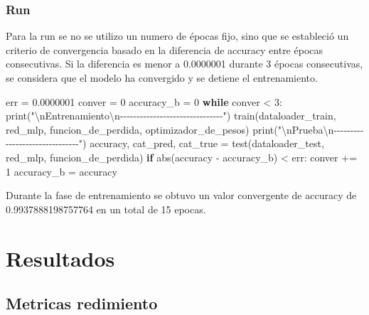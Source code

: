 \documentclass[
  10pt,
]{article}
\newenvironment{Shaded}{\begin{snugshade}}{\end{snugshade}}
\newcommand{\BuiltInTok}[1]{\textcolor[rgb]{0.00,0.23,0.31}{#1}}
\newcommand{\CharTok}[1]{\textcolor[rgb]{0.13,0.47,0.30}{#1}}
\newcommand{\ControlFlowTok}[1]{\textcolor[rgb]{0.00,0.23,0.31}{\textbf{#1}}}
\newcommand{\DecValTok}[1]{\textcolor[rgb]{0.68,0.00,0.00}{#1}}
\newcommand{\FloatTok}[1]{\textcolor[rgb]{0.68,0.00,0.00}{#1}}
\newcommand{\NormalTok}[1]{\textcolor[rgb]{0.00,0.23,0.31}{#1}}
\newcommand{\OperatorTok}[1]{\textcolor[rgb]{0.37,0.37,0.37}{#1}}
\newcommand{\StringTok}[1]{\textcolor[rgb]{0.13,0.47,0.30}{#1}}
\begin{document}
\subsubsection{Run}\label{run}

Para la run se no se utilizo un numero de épocas fijo, sino que se
estableció un criterio de convergencia basado en la diferencia de
accuracy entre épocas consecutivas. Si la diferencia es menor a
0.0000001 durante 3 épocas consecutivas, se considera que el modelo ha
convergido y se detiene el entrenamiento.

\begin{Shaded}
\begin{Highlighting}[]
\NormalTok{err }\OperatorTok{=} \FloatTok{0.0000001}
\NormalTok{conver }\OperatorTok{=} \DecValTok{0}
\NormalTok{accuracy\_b }\OperatorTok{=} \DecValTok{0}
\ControlFlowTok{while}\NormalTok{ conver }\OperatorTok{\textless{}} \DecValTok{3}\NormalTok{:}
    \BuiltInTok{print}\NormalTok{(}\StringTok{"}\CharTok{\textbackslash{}n}\StringTok{Entrenamiento}\CharTok{\textbackslash{}n}\StringTok{{-}{-}{-}{-}{-}{-}{-}{-}{-}{-}{-}{-}{-}{-}{-}{-}{-}{-}{-}{-}{-}{-}{-}{-}{-}{-}{-}{-}{-}{-}{-}"}\NormalTok{)}
\NormalTok{    train(dataloader\_train, red\_mlp, funcion\_de\_perdida, optimizador\_de\_pesos)}
    \BuiltInTok{print}\NormalTok{(}\StringTok{"}\CharTok{\textbackslash{}n}\StringTok{Prueba}\CharTok{\textbackslash{}n}\StringTok{{-}{-}{-}{-}{-}{-}{-}{-}{-}{-}{-}{-}{-}{-}{-}{-}{-}{-}{-}{-}{-}{-}{-}{-}{-}{-}{-}{-}{-}{-}{-}"}\NormalTok{)}
\NormalTok{    accuracy, cat\_pred, cat\_true }\OperatorTok{=}\NormalTok{ test(dataloader\_test, red\_mlp, funcion\_de\_perdida)}
    \ControlFlowTok{if} \BuiltInTok{abs}\NormalTok{(accuracy }\OperatorTok{{-}}\NormalTok{ accuracy\_b) }\OperatorTok{\textless{}}\NormalTok{ err:}
\NormalTok{        conver }\OperatorTok{+=} \DecValTok{1}
\NormalTok{    accuracy\_b }\OperatorTok{=}\NormalTok{ accuracy}
\end{Highlighting}
\end{Shaded}

Durante la fase de entrenamiento se obtuvo un valor convergente de
accuracy de 0.9937888198757764 en un total de 15 epocas.

\section{Resultados}\label{resultados}

\subsection{Metricas redimiento}\label{metricas-redimiento}
\end{document}
